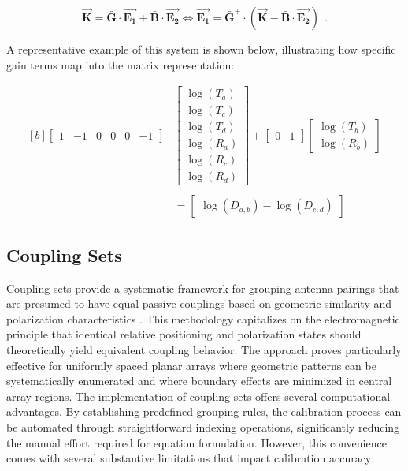 \documentclass[journal]{IEEEtran}
\begin{document}
\begin{equation}\label{eq:vectorizedFull}
    \vec{\mathbf{K}} = \bar{\mathbf{G}} \cdot \vec{\mathbf{E_1}} + \bar{\mathbf{B}} \cdot \vec{\mathbf{E_2}} 
    \iff 
    \vec{\mathbf{E_1}} = \bar{\mathbf{G}}^{+} \cdot (\vec{\mathbf{K}} - \bar{\mathbf{B}} \cdot \vec{\mathbf{E_2}}) ~~. 
\end{equation}

A representative example of this system is shown below, illustrating how specific gain terms map into the matrix representation:

\begin{equation}
\begin{aligned}[b]
    \begin{bmatrix}
        1 & -1 & 0 & 0 & 0 & -1
    \end{bmatrix}
    & \begin{bmatrix}
        \log(T_a) \\ \log(T_c) \\ \log(T_d) \\
        \log(R_a) \\ \log(R_c) \\ \log(R_d)
    \end{bmatrix}
    + 
    \begin{bmatrix}
        0 & 1
    \end{bmatrix}
    \begin{bmatrix}
        \log(T_b) \\ \log(R_b)
    \end{bmatrix} \\  \\
    & = \begin{bmatrix}
        \log(D_{a,b}) - \log(D_{c,d})
    \end{bmatrix}
\end{aligned}
\label{Matrix}
\end{equation}

\subsection{Coupling Sets}
Coupling sets provide a systematic framework for grouping antenna pairings that are presumed to have equal passive couplings based on geometric similarity and polarization characteristics \cite{lebron,bekers,javier}. This methodology capitalizes on the electromagnetic principle that identical relative positioning and polarization states should theoretically yield equivalent coupling behavior. The approach proves particularly effective for uniformly spaced planar arrays where geometric patterns can be systematically enumerated and where boundary effects are minimized in central array regions.
The implementation of coupling sets offers several computational advantages. By establishing predefined grouping rules, the calibration process can be automated through straightforward indexing operations, significantly reducing the manual effort required for equation formulation. However, this convenience comes with several substantive limitations that impact calibration accuracy:
\end{document}
